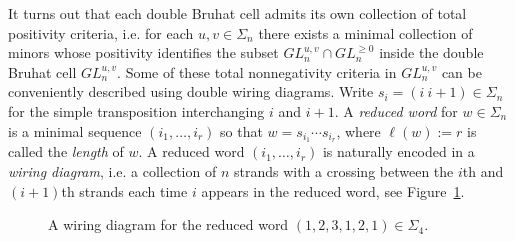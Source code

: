\documentclass{amsart}
\theoremstyle{definition}
\theoremstyle{remark}
\numberwithin{equation}{section}
\begin{document}
    It turns out that each double Bruhat cell admits its own collection of total positivity criteria, i.e. for each $u,v\in\Sigma_n$ there exists a minimal collection of minors whose positivity identifies the subset $GL_n^{u,v}\cap GL_n^{\ge0}$ inside the double Bruhat cell $GL_n^{u,v}$.
    Some of these total nonnegativity criteria in $GL_n^{u,v}$ can be conveniently described using double wiring diagrams.  Write $s_i=(i\ i+1)\in\Sigma_n$ for the simple transposition interchanging $i$ and $i+1$.  A \emph{reduced word} for $w\in\Sigma_n$ is a minimal sequence $(i_1,\ldots,i_r)$ so that $w=s_{i_1}\cdots s_{i_r}$, where $\ell(w):=r$ is called the \emph{length} of $w$.  A reduced word $(i_1,\ldots,i_r)$ is naturally encoded in a \emph{wiring diagram}, i.e. a collection of $n$ strands with a crossing between the $i$th and $(i+1)$th strands each time $i$ appears in the reduced word, see Figure~\ref{fig:wiring diagram}.
    \begin{figure}[ht]
    \caption{A wiring diagram for the reduced word $(1,2,3,1,2,1)\in\Sigma_4$.}
    \label{fig:wiring diagram}
    \end{figure}
\end{document}
